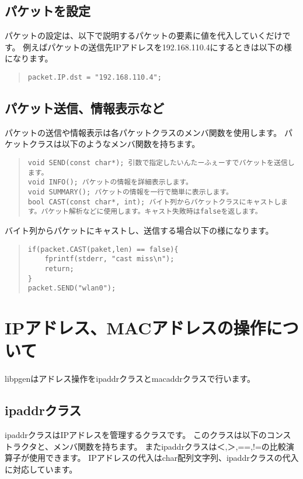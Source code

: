 \documentclass[12pt]{jsarticle}
\begin{document}
\subsection{パケットを設定}

パケットの設定は、以下で説明するパケットの要素に値を代入していくだけです。
例えばパケットの送信先IPアドレスを192.168.110.4にするときは以下の様になります。

\begin{quote}
\begin{verbatim}
packet.IP.dst = "192.168.110.4";
\end{verbatim}
\end{quote}


\subsection{パケット送信、情報表示など}

パケットの送信や情報表示は各パケットクラスのメンバ関数を使用します。
パケットクラスは以下のようなメンバ関数を持ちます。

\begin{quote}
\begin{verbatim}
void SEND(const char*); 引数で指定したいんたーふぇーすでパケットを送信します。
void INFO(); パケットの情報を詳細表示します。
void SUMMARY(); パケットの情報を一行で簡単に表示します。
bool CAST(const char*, int); バイト列からパケットクラスにキャストします。パケット解析などに使用します。キャスト失敗時はfalseを返します。
\end{verbatim}
\end{quote}

バイト列からパケットにキャストし、送信する場合以下の様になります。

\begin{quote}
\begin{verbatim}
if(packet.CAST(paket,len) == false){
    fprintf(stderr, "cast miss\n");	
    return;
}
packet.SEND("wlan0");
\end{verbatim}
\end{quote}



\newpage

\section{IPアドレス、MACアドレスの操作について}
libpgenはアドレス操作をipaddrクラスとmacaddrクラスで行います。

\subsection{ipaddrクラス}
ipaddrクラスはIPアドレスを管理するクラスです。
このクラスは以下のコンストラクタと、メンバ関数を持ちます。
またipaddrクラスは＜,＞,==,!=の比較演算子が使用できます。
IPアドレスの代入はchar配列文字列、ipaddrクラスの代入に対応しています。
\end{document}
